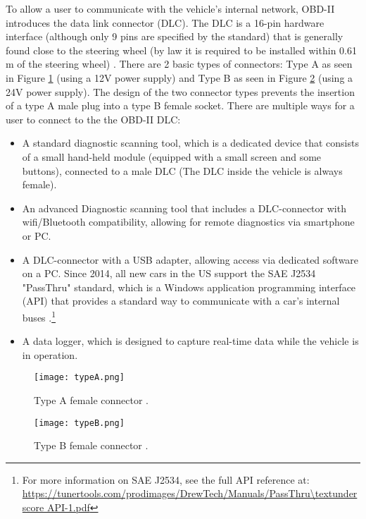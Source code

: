 To allow a user to communicate with the vehicle's internal network, OBD-II introduces the data link connector (DLC). The DLC is a 16-pin hardware interface (although only 9 pins are specified by the standard) that is generally found close to the steering wheel (by law it is required to be installed within 0.61 m of the steering wheel) \cite{wiki:OBD}. There are 2 basic types of connectors: Type A as seen in Figure \ref{fig:typeA} (using a 12V power supply) and Type B as seen in Figure \ref{fig:typeB} (using a 24V power supply). The design of the two connector types prevents the insertion of a type A male plug into a type B female socket. There are multiple ways for a user to connect to the the OBD-II DLC:
\begin{itemize}
	\item A standard diagnostic scanning tool, which is a dedicated device that consists of a small hand-held module (equipped with a small screen and some buttons), connected to a male DLC (The DLC inside the vehicle is always female).
	
	\item An advanced Diagnostic scanning tool that includes a DLC-connector with wifi/Bluetooth compatibility, allowing for remote diagnostics via smartphone or PC.
	
	\item A DLC-connector with a USB adapter, allowing access via dedicated software on a PC. Since 2014, all new cars in the US support the SAE J2534 "PassThru" standard, which is a Windows application programming interface (API) that provides a standard way to communicate with a car's internal buses \cite{Kosher}.\footnote{For more information on SAE J2534, see the full API reference at: \url{https://tunertools.com/prodimages/DrewTech/Manuals/PassThru\textunderscore API-1.pdf}}
	
	\item A data logger, which is designed to capture real-time data while the vehicle is in operation.
\end{itemize}

\begin{figure}[h]
	\centering
	\texttt{[image: typeA.png]}
	\caption{Type A female connector \cite{wiki:OBD}.}
	\label{fig:typeA}
\end{figure}

\begin{figure}[h]
	\centering
	\texttt{[image: typeB.png]}
	\caption{Type B female connector \cite{wiki:OBD}.}
	\label{fig:typeB}
\end{figure}

